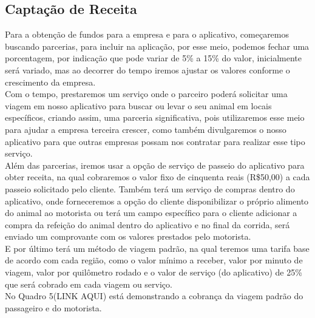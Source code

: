 \subsection{Captação de Receita}
Para a obtenção de fundos para a empresa e para o aplicativo, começaremos buscando parcerias, para incluir na aplicação, por esse meio, podemos fechar uma porcentagem, por indicação que pode variar de 5\% a 15\% do valor, inicialmente será variado, mas ao decorrer do tempo iremos ajustar os valores conforme o crescimento da empresa.\\
Com o tempo, prestaremos um serviço onde o parceiro poderá solicitar uma viagem em nosso aplicativo para buscar ou levar o seu animal em locais específicos, criando assim, uma parceria significativa, pois utilizaremos esse meio para ajudar a empresa terceira crescer, como também divulgaremos o nosso aplicativo para que outras empresas possam nos contratar para realizar esse tipo serviço. \\
Além das parcerias, iremos usar a opção de serviço de passeio do aplicativo para obter receita, na qual cobraremos o valor fixo de cinquenta reais (R\$50,00) a cada passeio solicitado pelo cliente. Também terá um serviço de compras dentro do aplicativo, onde forneceremos a opção do cliente disponibilizar o próprio alimento do animal ao motorista ou terá um campo específico para o cliente adicionar a compra da refeição do animal dentro do aplicativo e no final da corrida, será enviado um comprovante com os valores prestados pelo motorista. \\
E por último terá um método de viagem padrão, na qual teremos uma tarifa base de acordo com cada região, como o valor mínimo a receber, valor por minuto de viagem, valor por quilômetro rodado e o valor de serviço (do aplicativo) de 25\% que será cobrado em cada viagem ou serviço. \\
No Quadro 5(LINK AQUI) está demonstrando a cobrança da viagem padrão do passageiro e do motorista.\\

